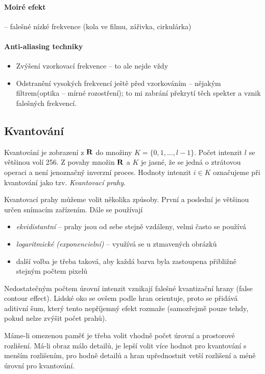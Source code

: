 \paragraph{Moiré efekt} -- falešné nízké frekvence (kola ve filmu, zářivka, cirkulárka)

\paragraph{Anti-aliasing techniky}
\begin{itemize}
\item Zvýšení vzorkovací frekvence -- to ale nejde vždy
\item Odstranění vysokých frekvencí ještě před vzorkováním -- nějakým filtrem(optika -- mírné rozostření); to mi zabrání překrytí těch spekter a vznik falešných frekvencí.
\end{itemize}

\subsection{Kvantování} 

Kvantování je zobrazení z $\mathbf{R}$ do množiny $K=\{0,1,\dots,l-1\}$. Počet intenzit $l$ se většinou volí 256. Z povahy množin $\mathbf{R}$ a $K$ je jasné, že se jedná o ztrátovou operaci a není jenoznačný inverzní proces. Hodnoty intenzit $i\in K$ označujeme při kvantování jako tzv. \emph{Kvantovací prahy}.

Kvantovací prahy můžeme volit několika způsoby. První a poslední je většinou určen snímacím zařízením. Dále se používají
\begin{itemize}
\item \emph{ekvidistantní} -- prahy jsou od sebe stejně vzdáleny, velmi často se používá
\item \emph{logaritmické (exponencielní)} -- využívá se u ztmavených obrázků
\item další volba je třeba taková, aby každá barva byla zastoupena přibližně stejným počtem pixelů
\end{itemize}

Nedostatečným počtem úrovní intenzit vznikají falešné kvantizační hrany (false contour effect). Lidské oko se ovšem podle hran orientuje, proto se přidává aditivní šum, který tento nepříjemný efekt rozmaže (samozřejmě pouze tehdy, pokud nelze zvýšit počet prahů).

Máme-li omezenou paměť je třeba volit vhodně počet úrovní a prostorové rozlišení. Má-li obraz málo detailů, je lepší volit více hodnot pro kvantování s menším rozlišením, pro hodně detailů a hran upřednostnit vetší rozlišení a méně úrovní pro kvantování.

